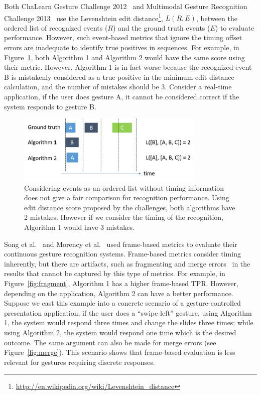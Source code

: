 Both ChaLearn Gesture Challenge 2012~\cite{guyon13} and Multimodal Gesture
Recognition Challenge 2013~\cite{escalera2013} use the Levenshtein edit
distance\footnote{\url{http://en.wikipedia.org/wiki/Levenshtein_distance}},
$L(R, E)$, between the ordered list of recognized events ($R$) and the ground
truth events ($E$) to evaluate performance. However, such event-based metrics
that ignore the timing offset errors are inadequate to identify true positives
in sequences. For example, in Figure~\ref{fig:edit-distance}, both Algorithm 1
and Algorithm 2 would have the same score using their metric. However, Algorithm
1 is in fact worse because the recognized event B is mistakenly considered as a
true positive in the minimum edit distance calculation, and the number
of mistakes should be 3.
Consider a real-time application, if the user does gesture A, it cannot be considered correct if the
system responds to gesture B.

\begin{figure}[tbh]
\centering
\includegraphics[width=0.8\textwidth]{figures/edit_distance.png}
\caption{Considering events as an ordered list without timing information does
not give a fair comparison for recognition performance. Using edit distance
score proposed by the challenges, both algorithms have 2 mistakes. However if
we consider the timing of the recognition, Algorithm 1 would have 3 mistakes.}
\label{fig:edit-distance}
\end{figure}

Song et al.~\cite{song12} and Morency et al.~\cite{morency07} used frame-based
metrics to evaluate their continuous gesture recognition systems. Frame-based
metrics consider timing inherently, but there are
artifacts, such as fragmenting and merge errors~\cite{ward11} in the results
that cannot be captured by this type of metrics. For example, in
Figure~\ref{fig:fragment}, Algorithm 1 has a higher frame-based TPR. However,
depending on the application, Algorithm 2 can have a better performance. Suppose we cast this example into a concrete scenario of a gesture-controlled presentation application, 
if the user does a ``swipe left'' gesture, using Algorithm 1, the system would
respond three times and change the slides three times; while using Algorithm 2,
the system would respond one time which is the desired outcome. The same
argument can also be made for merge errors (see Figure~\ref{fig:merge}). This
scenario shows that frame-based evaluation is less relevant for gestures
requiring discrete responses.

